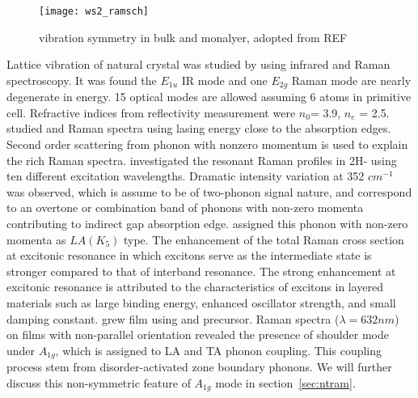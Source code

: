 \begin{figure}[htb]
\centering
\texttt{[image: ws2\_ramsch]}
\caption[ vibration symmetry]{ vibration symmetry in bulk and monalyer, adopted from REF\cite{Ghorbani-asl}}
\label{fig:ws2ramsch}
\end{figure}

Lattice vibration of natural  crystal was studied by \citeauthor{Wieting1971} using infrared and Raman spectroscopy.\cite{Wieting1971} It was found the $E_{1u}$ IR mode and one $E_{2g}$ Raman mode are nearly degenerate in energy. 15 optical modes are allowed assuming 6 atoms in primitive cell. Refractive indices from reflectivity measurement were $n_0$= 3.9, $n_e$ = 2.5. \citeauthor{Stacy1985} studied  and  Raman spectra using lasing energy close to the absorption edges.\cite{Stacy1985} Second order scattering from phonon with nonzero momentum is used to explain the rich Raman spectra. \citeauthor{Sourisseau1991} investigated the resonant Raman profiles in 2H- using ten different excitation wavelengths.\cite{Sourisseau1991} Dramatic intensity variation at 352 $cm^{-1}$ was observed, which is assume to be of two-phonon signal nature, and correspond to an overtone or combination band of phonons with non-zero momenta contributing to indirect gap absorption edge. \citeauthor{Sourisseau1991} assigned this phonon with non-zero momenta as $LA(K_5)$ type. The enhancement of the total Raman cross section at excitonic resonance in which excitons serve as the intermediate state is stronger compared to that of interband resonance. The strong enhancement at excitonic resonance is attributed to the characteristics of excitons in layered materials such as large binding energy, enhanced oscillator strength, and small damping constant.\cite{Zhao2013} \citeauthor{Chung1998} grew  film using  and  precursor.\cite{Chung1998} Raman spectra ($\lambda=632nm$) on films with non-parallel orientation revealed the presence of shoulder mode under $A_{1g}$, which is assigned to LA and TA phonon coupling. This coupling process stem from disorder-activated zone boundary phonons. We will further discuss this non-symmetric feature of $A_{1g}$ mode in section~\ref{sec:ntram}.

